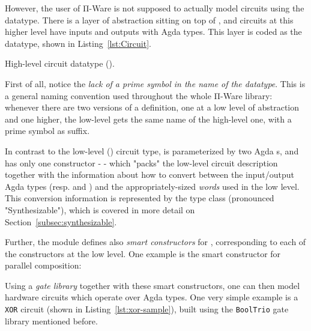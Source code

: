             However, the user of Π-Ware is not supposed to actually model circuits using the  datatype.
            There is a layer of abstraction sitting on top of ,
            and circuits at this higher level have inputs and outputs with Agda types.
            This layer is coded as the  datatype, shown in Listing~\ref{lst:Circuit}.

            \begin{listing}[h]
                \caption{High-level circuit datatype ().\label{lst:Circuit}}
            \end{listing}

            First of all, notice the \emph{lack of a prime symbol in the name of the datatype}.
            This is a general naming convention used throughout the whole Π-Ware library:
            whenever there are two versions of a definition, one at a low level of abstraction and
            one higher, the low-level gets the same name of the high-level one, with a prime symbol as suffix.

            In contrast to the low-level () circuit type,  is parameterized by two Agda s,
            and has only one constructor -  - which "packs" the low-level circuit description
            together with the information about how to convert between the input/output Agda types
            (resp.  and ) and the appropriately-sized \emph{words} used in the low level.
            This conversion information is represented by the  type class (pronounced "Synthesizable"),
            which is covered in more detail on Section~\ref{subsec:synthesizable}.

            Further, the  module defines also \emph{smart constructors} for ,
            corresponding to each of the constructors at the low level.
            One example is the smart constructor for parallel composition:

            \begin{center}
            \end{center}

            Using a \emph{gate library} together with these smart constructors, one can then model
            hardware circuits which operate over Agda types.
            One very simple example is a \texttt{XOR} circuit (shown in Listing~\ref{lst:xor-sample}),
            built using the \texttt{BoolTrio} gate library mentioned before.

